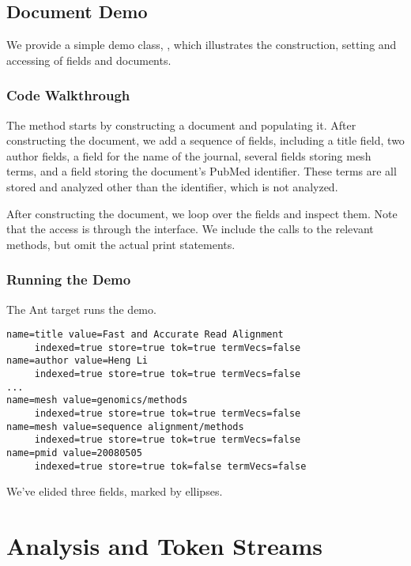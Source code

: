 \subsection{Document Demo}

We provide a simple demo class, , which illustrates
the construction, setting and accessing of fields and documents.

\subsubsection{Code Walkthrough}

The  method starts by constructing a document and
populating it.
%
%
After constructing the document, we add a sequence of fields,
including a title field, two author fields, a field for the name of
the journal, several fields storing mesh terms, and a field storing
the document's PubMed identifier.
These terms are all stored
and analyzed other than the identifier, which is not analyzed.

After constructing the document, we loop over the fields and
inspect them.
%
%
Note that the access is through the  interface.
We include the calls to the relevant methods, 
but omit the actual print statements.

\subsubsection{Running the Demo}

The Ant target  runs the demo.  
%
\begin{verbatim}
name=title value=Fast and Accurate Read Alignment
     indexed=true store=true tok=true termVecs=false
name=author value=Heng Li
     indexed=true store=true tok=true termVecs=false
...
name=mesh value=genomics/methods
     indexed=true store=true tok=true termVecs=false
name=mesh value=sequence alignment/methods
     indexed=true store=true tok=true termVecs=false
name=pmid value=20080505
     indexed=true store=true tok=false termVecs=false
\end{verbatim}
%
We've elided three fields, marked by ellipses.



\section{Analysis and Token Streams}\label{section:lucene-analysis}

